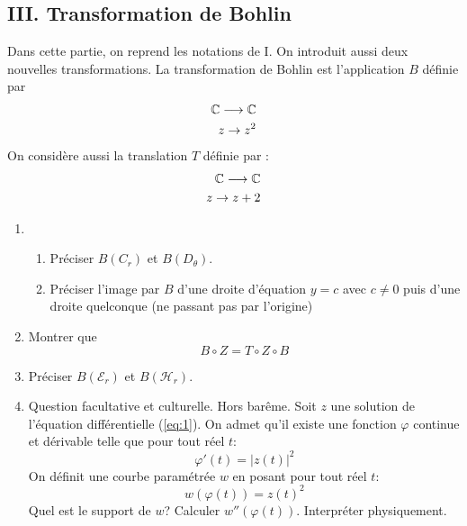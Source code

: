 \subsection*{III. Transformation de Bohlin}
Dans cette partie, on reprend les notations de I. On introduit aussi deux nouvelles transformations.
La transformation de Bohlin est l'application $B$ définie par
\begin{eqnarray*}
\mathbb{C} \longrightarrow \mathbb{C} \\
z\rightarrow z^2
\end{eqnarray*}
On considère aussi la translation $T$ définie par :
\begin{eqnarray*}
\mathbb{C} \longrightarrow \mathbb{C} \\
z\rightarrow z+2
\end{eqnarray*}
\begin{enumerate}
\item \begin{enumerate}
\item Préciser $B(C_r)$ et $B(D_\theta)$.
\item Préciser l'image par $B$ d'une droite d'équation $y=c$ avec $c\neq 0$ puis d'une droite quelconque (ne passant pas par l'origine) 
\end{enumerate}
\item Montrer que
\[B\circ Z = T\circ Z \circ B\]
\item Préciser $B(\mathcal{E}_r)$ et $B(\mathcal{H}_r)$.
\item Question facultative et culturelle. Hors barême.\newline
Soit $z$ une solution de l'équation différentielle (\ref{eq:1}). On admet qu'il existe une fonction $\varphi$ continue et dérivable telle que pour tout réel $t$:
\[\varphi'(t)=|z(t)|^2\]
On définit une courbe paramétrée $w$ en posant pour tout réel $t$:
\[w(\varphi(t))=z(t)^2\]
Quel est le support de $w$? Calculer $w''(\varphi(t))$. Interpréter physiquement.

\end{enumerate}
